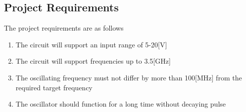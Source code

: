 \documentclass[]{extarticle}
\begin{document}
\subsection{Project Requirements}

The project requirements are as follows
\begin{enumerate}
    \item The circuit will support an input range of 5-20[V]
    \item The circuit will support frequencies up to 3.5[GHz]
    \item The oscillating frequency must not differ by more than 100[MHz] from the required target frequency
    \item The oscillator should function for a long time without decaying pulse
    
\end{enumerate}
\end{document}
